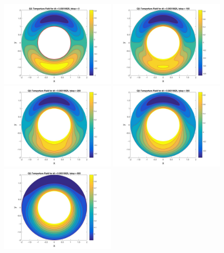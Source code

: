 \documentclass{article}
\begin{document}
	\begin{figure}[h!]
		\centering
		\includegraphics[width = 0.49\textwidth]{fig_q2DiffuseTest0}
		\includegraphics[width = 0.49\textwidth]{fig_q2DiffuseTest100}
		\includegraphics[width = 0.49\textwidth]{fig_q2DiffuseTest200}
		\includegraphics[width = 0.49\textwidth]{fig_q2DiffuseTest300}
		\includegraphics[width = 0.49\textwidth]{fig_q2DiffuseTest800}

\end{figure}
\end{document}
